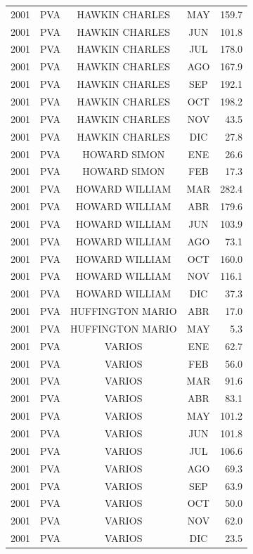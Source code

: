 \documentclass[12pt,]{article}
\begin{document}
\begin{table}[ht]
{\begin{tabular}{lcccr}
  2001 & PVA & HAWKIN CHARLES & MAY & 159.7 \\ 
  2001 & PVA & HAWKIN CHARLES & JUN & 101.8 \\ 
  2001 & PVA & HAWKIN CHARLES & JUL & 178.0 \\ 
  2001 & PVA & HAWKIN CHARLES & AGO & 167.9 \\ 
  2001 & PVA & HAWKIN CHARLES & SEP & 192.1 \\ 
  2001 & PVA & HAWKIN CHARLES & OCT & 198.2 \\ 
  2001 & PVA & HAWKIN CHARLES & NOV & 43.5 \\ 
  2001 & PVA & HAWKIN CHARLES & DIC & 27.8 \\ 
  2001 & PVA & HOWARD SIMON & ENE & 26.6 \\ 
  2001 & PVA & HOWARD SIMON & FEB & 17.3 \\ 
  2001 & PVA & HOWARD WILLIAM & MAR & 282.4 \\ 
  2001 & PVA & HOWARD WILLIAM & ABR & 179.6 \\ 
  2001 & PVA & HOWARD WILLIAM & JUN & 103.9 \\ 
  2001 & PVA & HOWARD WILLIAM & AGO & 73.1 \\ 
  2001 & PVA & HOWARD WILLIAM & OCT & 160.0 \\ 
  2001 & PVA & HOWARD WILLIAM & NOV & 116.1 \\ 
  2001 & PVA & HOWARD WILLIAM & DIC & 37.3 \\ 
  2001 & PVA & HUFFINGTON MARIO & ABR & 17.0 \\ 
  2001 & PVA & HUFFINGTON MARIO & MAY & 5.3 \\ 
  2001 & PVA & VARIOS & ENE & 62.7 \\ 
  2001 & PVA & VARIOS & FEB & 56.0 \\ 
  2001 & PVA & VARIOS & MAR & 91.6 \\ 
  2001 & PVA & VARIOS & ABR & 83.1 \\ 
  2001 & PVA & VARIOS & MAY & 101.2 \\ 
  2001 & PVA & VARIOS & JUN & 101.8 \\ 
  2001 & PVA & VARIOS & JUL & 106.6 \\ 
  2001 & PVA & VARIOS & AGO & 69.3 \\ 
  2001 & PVA & VARIOS & SEP & 63.9 \\ 
  2001 & PVA & VARIOS & OCT & 50.0 \\ 
  2001 & PVA & VARIOS & NOV & 62.0 \\ 
  2001 & PVA & VARIOS & DIC & 23.5 \\ 

\end{tabular}}
\end{table}
\end{document}
